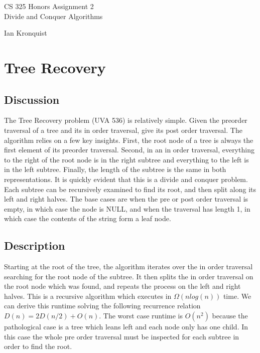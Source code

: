 \documentclass[12pt,letterpaper]{article}
\begin{document}
\begin{titlepage}
    \vspace*{4cm}
    \begin{flushright}
    {\huge
        CS 325 Honors Assignment 2\\[1cm]
    }
    {\large
        Divide and Conquer Algorithms
    }
    \end{flushright}
    \begin{flushleft}
    \end{flushleft}
    \begin{flushright}
    Ian Kronquist
    \end{flushright}

\end{titlepage}


\section{Tree Recovery}

\subsection{Discussion}
The Tree Recovery problem (UVA 536) is relatively simple. Given the preorder
traversal of a tree and its in order traversal, give its post order traversal.
The algorithm relies on a few key insights. First, the root node of a tree is
always the first element of its preorder traversal. Second, in an in order
traversal, everything to the right of the root node is in the right subtree and
everything to the left is in the left subtree. Finally, the length of the
subtree is the same in both representations. It is quickly evident that this
is a divide and conquer problem. Each subtree can be recursively examined to
find its root, and then split along its left and right halves. The base cases
are when the pre or post order traversal is empty, in which case the node is
NULL, and when the traversal has length 1, in which case the contents of the
string form a leaf node.

\subsection{Description}
Starting at the root of the tree, the algorithm iterates over the in order
traversal searching for the root node of the subtree. It then splits the in
order traversal on the root node which was found, and repeats the process on
the left and right halves.
This is a recursive algorithm which executes in $\Omega(nlog(n))$ time. We can
derive this runtime solving the following recurrence relation $D(n) = 2D(n/2) +
O(n)$. The worst case runtime is $O(n^2)$ because the pathological case is a tree
which leans left and each node only has one child. In this case the whole pre
order traversal must be inspected for each subtree in order to find the root.
\end{document}
